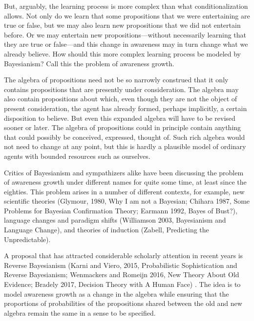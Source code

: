 \documentclass[
  11pt,
  dvipsnames,enabledeprecatedfontcommands]{scrartcl}
\begin{document}
But, arguably, the learning process is more complex than what
conditionalization allows. Not only do we learn that some propositions
that we were entertaining are true or false, but we may also learn new
propositions that we did not entertain before. Or we may entertain new
propositions---without necessarily learning that they are true or
false---and this change in awareness may in turn change what we already
believe. How should this more complex learning process be modeled by
Bayesianism? Call this the problem of awareness growth.

The algebra of propositions need not be so narrowly construed that it
only contains propositions that are presently under consideration. The
algebra may also contain propositions about which, even though they are
not the object of present consideration, the agent has already formed,
perhaps implicitly, a certain disposition to believe. But even this
expanded algebra will have to be revised sooner or later. The algebra of
propositions could in principle contain anything that could possibly be
conceived, expressed, thought of. Such rich algebra would not need to
change at any point, but this is hardly a plausible model of ordinary
agents with bounded resources such as ourselves.

Critics of Bayesianism and sympathizers alike have been discussing the
problem of awareness growth under different names for quite some time,
at least since the eighties. This problem arises in a number of
different contexts, for example, new scientific theories (Glymour, 1980,
Why I am not a Bayesian; Chihara 1987, Some Problems for Bayesian
Confirmation Theory; Earmann 1992, Bayes of Bust?), language changes and
paradigm shifts (Williamson 2003, Bayesianism and Language Change), and
theories of induction (Zabell, Predicting the Unpredictable).

A proposal that has attracted considerable scholarly attention in recent
years is Reverse Bayesianism (Karni and Viero, 2015, Probabilistic
Sophistication and Reverse Bayesianism; Wenmackers and Romeijn 2016, New
Theory About Old Evidence; Bradely 2017, Decision Theory with A Human
Face) . The idea is to model awareness growth as a change in the algebra
while ensuring that the proportions of probabilities of the propositions
shared between the old and new algebra remain the same in a sense to be
specified.
\end{document}
